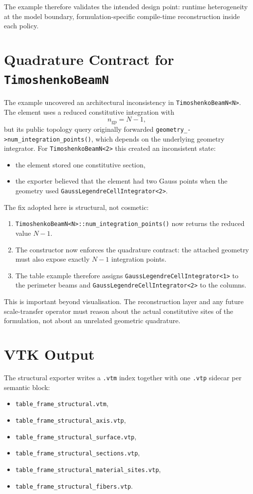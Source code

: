 The example therefore validates the intended design point: runtime
heterogeneity at the model boundary, formulation-specific compile-time
reconstruction inside each policy.

\section{Quadrature Contract for \texttt{TimoshenkoBeamN}}

The example uncovered an architectural inconsistency in
\texttt{TimoshenkoBeamN<N>}.  The element uses a reduced constitutive
integration with
\[
n_\mathrm{gp} = N - 1,
\]
but its public topology query originally forwarded
\texttt{geometry\_->num\_integration\_points()}, which depends on the
underlying geometry integrator.  For \texttt{TimoshenkoBeamN<2>} this created
an inconsistent state:
\begin{itemize}
  \item the element stored one constitutive section,
  \item the exporter believed that the element had two Gauss points when the
        geometry used \texttt{GaussLegendreCellIntegrator<2>}.
\end{itemize}

The fix adopted here is structural, not cosmetic:
\begin{enumerate}
  \item \texttt{TimoshenkoBeamN<N>::num\_integration\_points()} now returns
        the reduced value \(N-1\).
  \item The constructor now enforces the quadrature contract:
        the attached geometry must also expose exactly \(N-1\) integration
        points.
  \item The table example therefore assigns
        \texttt{GaussLegendreCellIntegrator<1>} to the perimeter beams and
        \texttt{GaussLegendreCellIntegrator<2>} to the columns.
\end{enumerate}

This is important beyond visualisation.  The reconstruction layer and any
future scale-transfer operator must reason about the actual constitutive sites
of the formulation, not about an unrelated geometric quadrature.

\section{VTK Output}

The structural exporter writes a \texttt{.vtm} index together with one
\texttt{.vtp} sidecar per semantic block:
\begin{itemize}
  \item \texttt{table\_frame\_structural.vtm},
  \item \texttt{table\_frame\_structural\_axis.vtp},
  \item \texttt{table\_frame\_structural\_surface.vtp},
  \item \texttt{table\_frame\_structural\_sections.vtp},
  \item \texttt{table\_frame\_structural\_material\_sites.vtp},
  \item \texttt{table\_frame\_structural\_fibers.vtp}.
\end{itemize}


